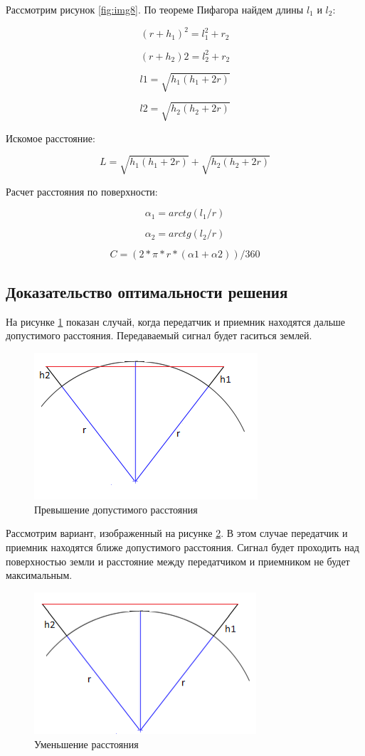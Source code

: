 Рассмотрим рисунок \ref{fig:img8}. По теореме Пифагора найдем длины $ l_1 $ и $ l_2 $: 

\[
(r+h_{1})^2=l_1^{2}+r_2
\]

\[
(r+h_{2})2=l_2^{2}+r_2
\]

\[
l1=\sqrt{h_{1}\left(h_{1}+2r\right)}
\]

\[
l2=\sqrt{h_{2}\left(h_{2}+2r\right)}
\]

Искомое расстояние: 

\[
L=\sqrt{h_{1}\left(h_{1}+2r\right)}+\sqrt{h_{2}\left(h_{2}+2r\right)}
\]

Расчет расстояния по поверхности: 

\[
\alpha_{1}=arctg(l_{1}/r)
\]

\[
\alpha_{2}=arctg(l_{2}/r)
\]

\[
C=(2*\pi*r*(\alpha1+\alpha2))/360
\]

\subsection{Доказательство оптимальности решения}
На рисунке \ref{fig:img9} показан случай, когда передатчик и приемник находятся дальше допустимого расстояния. Передаваемый сигнал будет гаситься землей.

\begin{figure}[H]
\centering{}\includegraphics[width=3.27in,height=2.15in]{img/kich_bur/image9.png}
\caption{Превышение допустимого расстояния}
\label{fig:img9}
\end{figure}

Рассмотрим вариант, изображенный на рисунке \ref{fig:img10}. В этом случае передатчик и приемник находятся ближе допустимого расстояния. Сигнал будет проходить над поверхностью земли и расстояние между передатчиком и приемником не будет максимальным. 

\begin{figure}[H]
\centering{}\includegraphics[width=3.25in,height=2.08in]{img/kich_bur/image10.png}
\caption{Уменьшение расстояния}
\label{fig:img10}
\end{figure}

